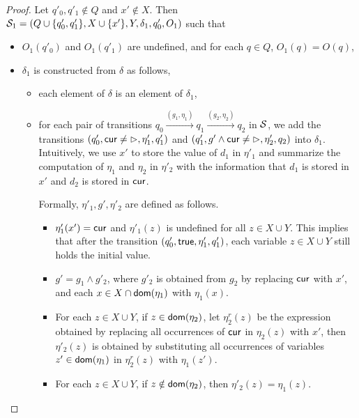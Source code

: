 \begin{appendix}
\begin{proof}
Let $q'_{0},q'_{1} \not \in Q$ and $x' \not \in X$. Then ${\mathcal{S} }_1 = (Q \cup \{q'_{0},q'_1\}, X \cup \{x'\}, Y, \delta_1, q'_{0}, O_1)$ such that 
\begin{itemize}
\item $O_1(q'_0)$ and $O_1(q'_1)$ are undefined, and for each $q \in Q$, $O_1(q)=O(q)$,
%
\item $\delta_1$ is constructed from $\delta$ as follows,
\begin{itemize}
\item each element of $\delta$ is an element of $\delta_1$,
%
\item for each pair of transitions $q_0 \xrightarrow{(g_1,\eta_1)} q_1 \xrightarrow{(g_2,\eta_2)} q_2$ in ${\mathcal{S} }$, we add the transitions $(q'_0, \mathsf{cur}\neq \rhd, \eta'_1, q'_1)$ and $(q'_1, g'\wedge \mathsf{cur} \neq \rhd, \eta'_2, q_2)$ into $\delta_1$. Intuitively, we use $x'$ to store the value of $d_1$ in $ \eta'_1$ and summarize the computation of $\eta_1$ and $\eta_2$ in $\eta'_2$ with the information that $d_1$ is stored in $x'$ and $d_2$ is stored in $\mathsf{cur}$.


Formally, $\eta'_1, g', \eta'_2$ are defined as follows.
\begin{itemize}
\item $\eta'_1(x')=\mathsf{cur}$ and $\eta'_1(z)$ is undefined for all $z \in X\cup Y$. This implies that after the transition $(q'_0, \mathsf{true}, \eta'_1, q'_1)$, each variable $z \in X \cup Y$ still holds the initial value.  
%
\item $g' = g_1 \wedge g'_2$, where $g'_2$ is obtained from $g_2$ by replacing $\mathsf{cur}$ with $x'$, and each $x \in X\cap \mathsf{dom}(\eta_1)$ with $\eta_1(x)$.
%
\item For each $z \in X\cup Y$, if $z \in \mathsf{dom}(\eta_2)$, let $\eta_2^r(z)$ be the expression obtained by replacing all occurrences of $\mathsf{cur}$ in $\eta_2(z)$ with $x'$,
then $\eta'_2(z)$ is obtained by substituting all occurrences of variables $z' \in \mathsf{dom}(\eta_1)$ in $\eta_2^r(z)$ with $\eta_1(z')$. 
\item For each $z \in X\cup Y$, if $z \notin \mathsf{dom}(\eta_2)$, then $\eta'_2(z)=\eta_1(z)$.
%

\end{itemize}
\end{itemize}
\end{itemize}
\end{proof}
\end{appendix}
